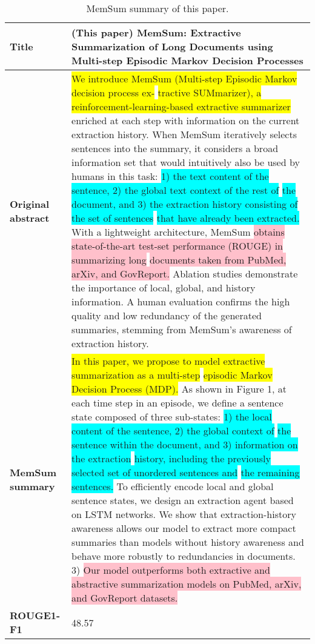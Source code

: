 \documentclass[11pt]{article}
\begin{document}
\begin{table*}[ht]
\centering
\begin{tabularx}{\linewidth}{l|X}
\toprule 
\textbf{Title} & (This paper) MemSum: Extractive Summarization of Long Documents using Multi-step Episodic Markov Decision Processes\\ \midrule
\textbf{Original abstract} & \colorbox{yellow}{We introduce MemSum (Multi-step Episodic Markov decision process ex-} \colorbox{yellow}{tractive SUMmarizer), a reinforcement-learning-based extractive summarizer} enriched at each step with information on the current extraction history. When MemSum iteratively selects sentences into the summary, it considers a broad information set that would intuitively also be used by humans in this task: \colorbox{cyan}{1) the text content of the sentence, 2) the global text context of the rest of} \colorbox{cyan}{the document, and 3) the extraction history consisting of the set of sentences} \colorbox{cyan}{that have already been extracted.} With a lightweight architecture, MemSum \colorbox{pink}{obtains state-of-the-art test-set performance (ROUGE) in summarizing long} \colorbox{pink}{documents taken from PubMed, arXiv, and GovReport.} Ablation studies demonstrate the importance of local, global, and history information. A human evaluation confirms the high quality and low redundancy of the generated summaries, stemming from MemSum's awareness of extraction history.
\\ \midrule

\textbf{MemSum summary} & \colorbox{yellow}{In this paper, we propose to model extractive summarization as a multi-step} \colorbox{yellow}{episodic Markov Decision Process (MDP).}
As shown in Figure 1, at each time step in an episode, we define a sentence state composed of three sub-states: \colorbox{cyan}{1) the local content of the sentence, 2) the global context of} \colorbox{cyan}{the sentence within the document, and 3) information on the extraction} \colorbox{cyan}{history, including the previously selected set of unordered sentences and} \colorbox{cyan}{the remaining sentences.}
To efficiently encode local and global sentence states, we design an extraction agent based on LSTM networks.
We show that extraction-history awareness allows our model to extract more compact summaries than models without history awareness and behave more robustly to redundancies in documents. 3) \colorbox{pink}{Our model outperforms both extractive and} \colorbox{pink}{abstractive summarization models on PubMed, arXiv, and GovReport datasets.}
 \\ \midrule
\textbf{ROUGE1-F1} & 48.57 \\

\bottomrule
\end{tabularx}
\caption{ \label{tab:summarization_example_memsum} MemSum summary of this paper. }
\end{table*}
\end{document}
